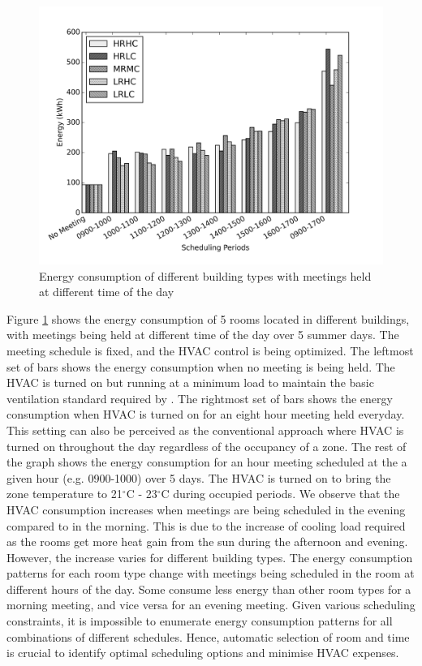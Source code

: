 \begin{figure}
	\centering
		\includegraphics[width=0.74\linewidth,keepaspectratio]{./figs/mip_room_energy.png}		
	\caption{Energy consumption of different building types with meetings held at different time of the day}
	\label{fig:mip_re}
\end{figure}

Figure \ref{fig:mip_re} shows the energy consumption of 5 rooms located in different buildings, with meetings being held at different time of the day over 5 summer days. The meeting schedule is fixed, and the HVAC control is being optimized. The leftmost set of bars shows the energy consumption when no meeting is being held. The HVAC is turned on but running at a minimum load to maintain the basic ventilation standard required by \cite{ashrae2013thermal}. The rightmost set of bars shows the energy consumption when HVAC is turned on for an eight hour meeting held everyday. This setting can also be perceived as the conventional approach where HVAC is turned on throughout the day regardless of the occupancy of a zone. The rest of the graph shows the energy consumption for an hour meeting scheduled at the a given hour (e.g. 0900-1000) over 5 days. The HVAC is turned on to bring the zone temperature to 21$^\circ$C - 23$^\circ$C during occupied periods. We observe that the HVAC consumption increases when meetings are being scheduled in the evening compared to in the morning. This is due to the increase of cooling load required as the rooms get more heat gain from the sun during the afternoon and evening. However, the increase varies for different building types. The energy consumption patterns for each room type change with meetings being scheduled in the room at different hours of the day. Some consume less energy than other room types for a morning meeting, and vice versa for an evening meeting. Given various scheduling constraints, it is impossible to enumerate energy consumption patterns for all combinations of different schedules. Hence, automatic selection of room and time is crucial to identify optimal scheduling options and minimise HVAC expenses. 

